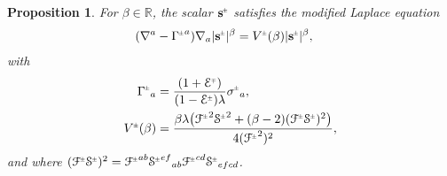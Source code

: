 \documentclass[a4paper,10pt,reqno]{amsart}
\newcommand{\Reals}{\mathbb{R}}
\newcommand{\Scal}{\mathop{\rm Scal}}
\theoremstyle{plain}
\newtheorem{prop}[thm]{Proposition}
\newcommand{\PM}[1]{{{#1}^{\hspace{-.5pt}\scaleto{\pm}{3.5pt}}}}
\newcommand{\MP}[1]{{{#1}^{\hspace{-.5pt}\scaleto{\mp}{3.5pt}}}}
\def\Fcal{\mathcal{F}}
\def\Ecal{\mathcal{E}}
\def\Scal{\mathcal{S}}
\def\sbold{\mathbf{s}}
\numberwithin{equation}{section}
\begin{document}
\begin{prop} \label{prop:MS} 
For  $\beta \in \Reals$, the scalar $\PM{\sbold}$ satisfies the modified Laplace equation
\begin{align} \label{eq:LaplaceMSscalar}
(\nabla^{a} - \PM{\Gamma}^{a}) \nabla_{a} |\PM{\sbold}|^\beta ={}& \PM{V}(\beta) |\PM{\sbold}|^\beta,
\end{align}
with  
\begin{align}
\PM{\Gamma}_{a}={}&\frac{(1 + \MP{\Ecal}) }{(1 -  \PM{\Ecal}) \lambda} \PM{\sigma}_{a}, \label{eq:Gammapm}\\
\PM{V}(\beta) ={}& \frac{\beta \lambda \bigl(\PM{\Fcal}^2 \PM{\Scal}^2 + (\beta - 2) (\PM{\Fcal}\PM{\Scal})^2 \bigr) }{4 (\PM{\Fcal}^2)^2}, \label{eq:Vpm}
\end{align}
and where $(\PM{\Fcal}\PM{\Scal})^2 = \PM{\Fcal}^{ab} \PM{\Scal}^{ef}{}_{ab} \PM{\Fcal}^{cd} \PM{\Scal}_{efcd} $.
\end{prop}
\end{document}
